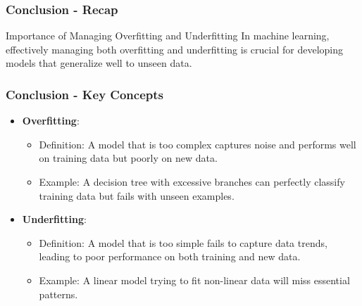 \documentclass[aspectratio=169]{beamer}
\begin{document}
\begin{frame}[fragile]
    \frametitle{Conclusion - Recap}
    \begin{block}{Importance of Managing Overfitting and Underfitting}
        In machine learning, effectively managing both overfitting and underfitting is crucial for developing models that generalize well to unseen data. 
    \end{block}
\end{frame}

\begin{frame}[fragile]
    \frametitle{Conclusion - Key Concepts}
    \begin{itemize}
        \item \textbf{Overfitting}:
            \begin{itemize}
                \item Definition: A model that is too complex captures noise and performs well on training data but poorly on new data.
                \item Example: A decision tree with excessive branches can perfectly classify training data but fails with unseen examples.
            \end{itemize}
        \item \textbf{Underfitting}:
            \begin{itemize}
                \item Definition: A model that is too simple fails to capture data trends, leading to poor performance on both training and new data.
                \item Example: A linear model trying to fit non-linear data will miss essential patterns.
            \end{itemize}
    \end{itemize}
\end{frame}
\end{document}
